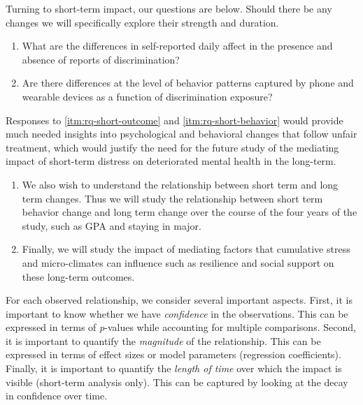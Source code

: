 Turning to short-term impact, our questions are below. Should there be any changes we will specifically explore their strength and duration.

\begin{enumerate}[start=3,label={\bfseries RQ\arabic*}, leftmargin=1.5cm]
    \item \label{itm:rq-short-outcome} What are the differences in self-reported daily affect in the presence and absence of reports of discrimination? %
    \item \label{itm:rq-short-behavior} Are there differences at the level of behavior patterns captured by phone and  wearable devices as a function of discrimination exposure?
\end{enumerate}

Responses to \ref{itm:rq-short-outcome} and \ref{itm:rq-short-behavior} would provide much needed insights into psychological and behavioral changes that follow unfair treatment, which would justify the need for the future study of the mediating impact of short-term distress on deteriorated mental health in the long-term.

\begin{enumerate}[start=5,label={\bfseries RQ\arabic*}, leftmargin=1.5cm]
\item \label{itm:rq-short-long} We also wish to understand the relationship between short term and long term changes. Thus we will study the relationship between short term behavior change and long term change over the course of the four years of the study, such as GPA and staying in major. 
\item \label{itm:rq-short-long-mediation} Finally, we will study the impact of mediating factors that cumulative stress and micro-climates can influence such as resilience and social support on these long-term outcomes. 

\end{enumerate}


For each observed relationship, we consider several important aspects. First, it is important to know whether we have \textit{confidence} in the observations. This can be expressed in terms of \textit{p}-values while accounting for multiple comparisons. 
Second, it is important to quantify the \textit{magnitude} of the relationship. This can be expressed in terms of effect sizes or model parameters (\eg regression coefficients).
Finally, it is important to quantify the \textit{length of time} over which the impact is visible (short-term analysis only). This can be captured by looking at the decay in confidence over time.


